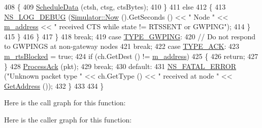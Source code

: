 \begin{DoxyCode}
408                   \{
409                     \hyperlink{classns3_1_1UanMacRc_a050570db8ee60717b778e06a9b8b9e77}{ScheduleData} (ctsh, ctsg, ctsBytes);
410                   \}
411                 \textcolor{keywordflow}{else}
412                   \{
413                     \hyperlink{group__logging_ga413f1886406d49f59a6a0a89b77b4d0a}{NS\_LOG\_DEBUG} (\hyperlink{classns3_1_1Simulator_ac3178fa975b419f7875e7105be122800}{Simulator::Now} ().GetSeconds () << \textcolor{stringliteral}{" Node "} << 
      \hyperlink{classns3_1_1UanMacRc_ac389a0236fcf75155c45a9a1cdf0f288}{m\_address} << \textcolor{stringliteral}{" received CTS while state != RTSSENT or GWPING"});
414                   \}
415               \}
416           \}
417       \}
418       \textcolor{keywordflow}{break};
419     \textcolor{keywordflow}{case} \hyperlink{classns3_1_1UanMacRc_ad12bbd636f03943095e1c81cd1cc24b3a704bedfcbfafb80b9a7d280385e60e8b}{TYPE\_GWPING}:
420       \textcolor{comment}{// Do not respond to GWPINGS at non-gateway nodes}
421       \textcolor{keywordflow}{break};
422     \textcolor{keywordflow}{case} \hyperlink{classns3_1_1UanMacRc_ad12bbd636f03943095e1c81cd1cc24b3a39266e2ea841589d68abb33f3691d9b3}{TYPE\_ACK}:
423       \hyperlink{classns3_1_1UanMacRc_aa85fcd87a24f6ebb5425cbd5f08a6205}{m\_rtsBlocked} = \textcolor{keyword}{true};
424       \textcolor{keywordflow}{if} (ch.GetDest () != \hyperlink{classns3_1_1UanMacRc_ac389a0236fcf75155c45a9a1cdf0f288}{m\_address})
425         \{
426           \textcolor{keywordflow}{return};
427         \}
428       \hyperlink{classns3_1_1UanMacRc_a9c52fc366178533ec87fa9677c6c7f97}{ProcessAck} (pkt);
429       \textcolor{keywordflow}{break};
430     \textcolor{keywordflow}{default}:
431       \hyperlink{group__fatal_ga5131d5e3f75d7d4cbfd706ac456fdc85}{NS\_FATAL\_ERROR} (\textcolor{stringliteral}{"Unknown packet type "} << ch.GetType () << \textcolor{stringliteral}{" received at node "} << 
      \hyperlink{classns3_1_1UanMacRc_a31648a747e947870f4ec77015cd31c46}{GetAddress} ());
432     \}
433 
434 \}
\end{DoxyCode}


Here is the call graph for this function\+:




Here is the caller graph for this function\+:


